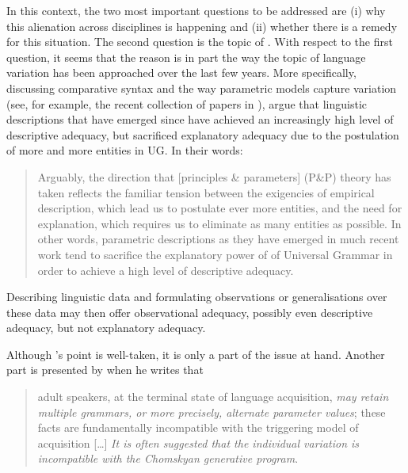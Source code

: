 \documentclass[output=paper]{langsci/langscibook}
\begin{document}
In this context, the two most important questions to be addressed are (i) why
this alienation across disciplines is happening and (ii) whether there is a
remedy for this situation. The second question is the topic of . With
respect to the first question, it seems that the reason is in part the way the
topic of language variation has been approached over the last few years. More
specifically, discussing comparative syntax and the way parametric models
capture variation (see, for example, the recent collection of papers in
\citealt{FábregasEtAl2015}), \citet{BibHolRobShee2014} argue that linguistic
descriptions that have emerged since \citet{Chomsky1981} have achieved an
increasingly high level of descriptive adequacy, but sacrificed explanatory
adequacy due to the postulation of more and more entities in \gls{UG}. In their
words:

\begin{quote}

Arguably, the direction that [principles \& parameters] (P\&P) theory has taken
reflects the familiar tension between the exigencies of empirical description,
which lead us to postulate ever more entities, and the need for explanation,
which requires us to eliminate as many entities as possible. In other words,
parametric descriptions as they have emerged in much recent work tend to
sacrifice the explanatory power of  of Universal Grammar in order to
achieve a high level of descriptive adequacy.
\parencite[104]{BibHolRobShee2014}

\end{quote}

Describing linguistic data and formulating observations or generalisations over
these data may then offer observational adequacy, possibly even descriptive
adequacy, but not explanatory adequacy.

Although \citeauthor{BibHolRobShee2014}'s point is well-taken, it is only a
part of the issue at hand. Another part is presented by \citet{Yang2004} when
he writes that

\begin{quote}

adult speakers, at the terminal state of language acquisition, \emph{may retain
    multiple grammars, or more precisely, alternate parameter values}; these
    facts are fundamentally incompatible with the triggering model of
    acquisition [\dots{}] \emph{It is often suggested that the individual
    variation is incompatible with the Chomskyan generative program}.
    \parencite[50--51]{Yang2004}

\end{quote}
\end{document}
